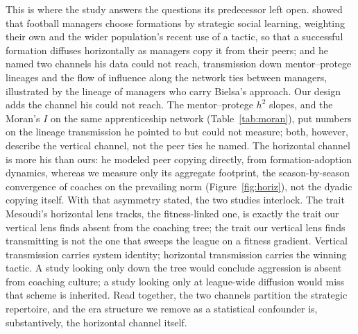 \documentclass[
  journal=ehs,
  manuscript=article,
  year=2026,
  volume=8,
]{cup-journal}
\begin{document}
This is where the study answers the questions its predecessor left open.
\textcite{mesoudi2020} showed that football managers choose formations by strategic
social learning, weighting their own and the wider population's recent use of a
tactic, so that a successful formation diffuses horizontally as managers copy it from
their peers; and he named two channels his data could not reach, transmission down
mentor--protege lineages and the flow of influence along the network ties between
managers, illustrated by the lineage of managers who carry Bielsa's approach. Our
design adds the channel his could not reach. The mentor--protege $h^{2}$ slopes, and
the Moran's $I$ on the same apprenticeship network (Table~\ref{tab:moran}), put
numbers on the lineage transmission he pointed to but could not measure; both,
however, describe the vertical channel, not the peer ties he named. The horizontal
channel is more his than ours: he modeled peer copying directly, from
formation-adoption dynamics, whereas we measure only its aggregate footprint, the
season-by-season convergence of coaches on the prevailing norm
(Figure~\ref{fig:horiz}), not the dyadic copying itself. With that asymmetry stated,
the two studies interlock. The trait
Mesoudi's horizontal lens tracks, the fitness-linked one, is exactly the trait our
vertical lens finds absent from the coaching tree; the trait our vertical lens finds
transmitting is not the one that sweeps the league on a fitness gradient. Vertical
transmission carries system identity; horizontal transmission carries the winning
tactic. A study looking only down the tree would conclude aggression is absent from
coaching culture; a study looking only at league-wide diffusion would miss that
scheme is inherited.
Read together, the two channels partition the strategic repertoire, and the era
structure we remove as a statistical confounder is, substantively, the horizontal
channel itself.
\end{document}
